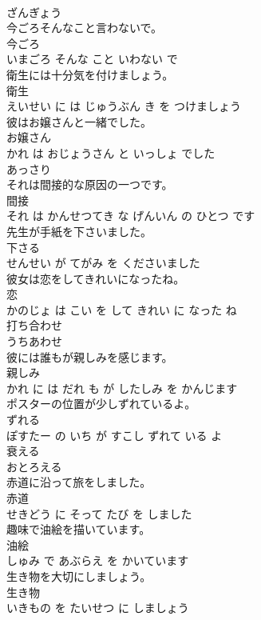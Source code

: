 \documentclass[8pt]{extreport}
\begin{document}
\begin{CJK}{UTF8}{min}
\\	ざんぎょう			
\\	今ごろそんなこと言わないで。	
\\	今ごろ 
\\	いまごろ そんな こと いわない で			
\\	衛生には十分気を付けましょう。	
\\	衛生 
\\	えいせい に は じゅうぶん き を つけましょう			
\\	彼はお嬢さんと一緒でした。	
\\	お嬢さん 
\\	かれ は おじょうさん と いっしょ でした			
\\	あっさり	
\\	それは間接的な原因の一つです。	
\\	間接 
\\	それ は かんせつてき な げんいん の ひとつ です			
\\	先生が手紙を下さいました。	
\\	下さる 
\\	せんせい が てがみ を くださいました			
\\	彼女は恋をしてきれいになったね。	
\\	恋 
\\	かのじょ は こい を して きれい に なった ね			
\\	打ち合わせ	
\\	うちあわせ			
\\	彼には誰もが親しみを感じます。	
\\	親しみ 
\\	かれ に は だれ も が したしみ を かんじます			
\\	ポスターの位置が少しずれているよ。	
\\	ずれる 
\\	ぽすたー の いち が すこし ずれて いる よ			
\\	衰える	
\\	おとろえる			
\\	赤道に沿って旅をしました。	
\\	赤道 
\\	せきどう に そって たび を しました			
\\	趣味で油絵を描いています。	
\\	油絵 
\\	しゅみ で あぶらえ を かいています			
\\	生き物を大切にしましょう。	
\\	生き物 
\\	いきもの を たいせつ に しましょう			

\end{CJK}
\end{document}
